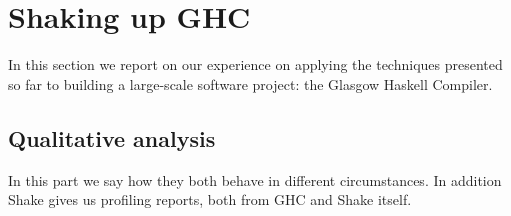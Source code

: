 \section{Shaking up GHC\label{sec:ghc}}

In this section we report on our experience on applying the techniques presented
so far to building a large-scale software project: the Glasgow Haskell Compiler.


\subsection{Qualitative analysis}

In this part we say how they both behave in different circumstances. In addition Shake gives us profiling reports, both from GHC and Shake itself.



